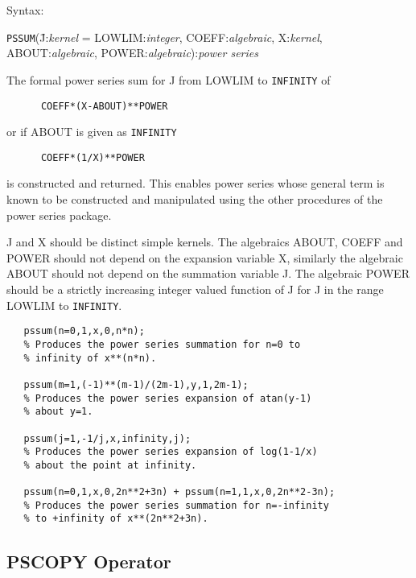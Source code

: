 Syntax:

\begin{tabbing}
\hspace*{2em} {\tt PSSUM}(\=J:{\em kernel} = LOWLIM:{\em integer},
COEFF:{\em algebraic}, X:{\em kernel}, \\ 
\> ABOUT:{\em algebraic}, POWER:{\em algebraic}):{\em power series}
\end{tabbing}

The formal power series sum for J from LOWLIM to {\tt INFINITY} of 

\begin{verbatim}
      COEFF*(X-ABOUT)**POWER
\end{verbatim}

or if ABOUT is given as {\tt INFINITY}

\begin{verbatim}
      COEFF*(1/X)**POWER
\end{verbatim}

is constructed and returned. This enables power series whose general
term is known to be constructed and manipulated using the other
procedures of the power series package. 

J and X should be distinct simple kernels. The algebraics
ABOUT,  COEFF and POWER should not depend on the
expansion variable X, similarly the algebraic ABOUT should
not depend on the summation variable J.  The algebraic POWER should be
a strictly increasing integer valued function of J for J in the range
LOWLIM to {\tt INFINITY}.

\begin{verbatim}
   pssum(n=0,1,x,0,n*n);
   % Produces the power series summation for n=0 to
   % infinity of x**(n*n).

   pssum(m=1,(-1)**(m-1)/(2m-1),y,1,2m-1);
   % Produces the power series expansion of atan(y-1)
   % about y=1.

   pssum(j=1,-1/j,x,infinity,j);
   % Produces the power series expansion of log(1-1/x)
   % about the point at infinity.

   pssum(n=0,1,x,0,2n**2+3n) + pssum(n=1,1,x,0,2n**2-3n);
   % Produces the power series summation for n=-infinity
   % to +infinity of x**(2n**2+3n).
\end{verbatim}

\subsection{PSCOPY Operator}

